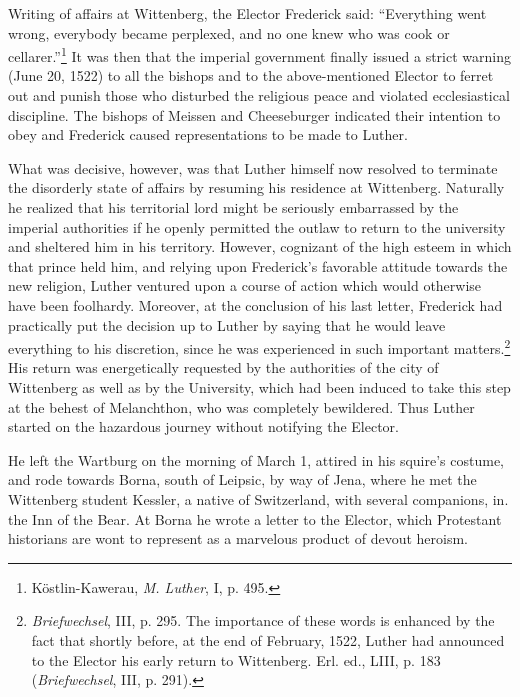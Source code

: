 Writing of affairs at Wittenberg, the Elector Frederick said:
“Everything went wrong, everybody became perplexed, and no one
knew who was cook or cellarer.”\footnote{Köstlin-Kawerau, \textit{M. Luther}, I, p. 495.}
It was then that the imperial government
finally issued a strict warning (June 20, 1522) to all the
bishops and to the above-mentioned Elector to ferret out and punish
those who disturbed the religious peace and violated ecclesiastical discipline.
The bishops of Meissen and Cheeseburger indicated their intention to obey
and Frederick caused representations to be made to
Luther.

What was decisive, however, was that Luther himself now resolved
to terminate the disorderly state of affairs by resuming his residence
at Wittenberg. Naturally he realized that his territorial lord might
be seriously embarrassed by the imperial authorities if he openly
permitted the outlaw to return to the university and sheltered him
in his territory. However, cognizant of the high esteem in which that
prince held him, and relying upon Frederick’s favorable attitude
towards the new religion, Luther ventured upon a course of action
which would otherwise have been foolhardy. Moreover, at the conclusion
of his last letter, Frederick had practically put the decision
up to Luther by saying that he would leave everything to his discretion,
since he was experienced in such important matters.\footnote
{\textit{Briefwechsel}, III, p. 295. The importance of these words is enhanced by the fact
that shortly before, at the end of February, 1522, Luther had announced to the Elector his
early return to Wittenberg. Erl. ed., LIII, p. 183 (\textit{Briefwechsel}, III, p. 291).}
His return was energetically requested by the authorities of the city of
Wittenberg as well as by the University, which had been induced to
take this step at the behest of Melanchthon, who was completely bewildered.
Thus Luther started on the hazardous journey without
notifying the Elector.

He left the Wartburg on the morning of March 1, attired in his
squire’s costume, and rode towards Borna, south of Leipsic, by way of
Jena, where he met the Wittenberg student Kessler, a native of
Switzerland, with several companions, in. the Inn of the Bear. At
Borna he wrote a letter to the Elector, which Protestant historians
are wont to represent as a marvelous product of devout heroism.

